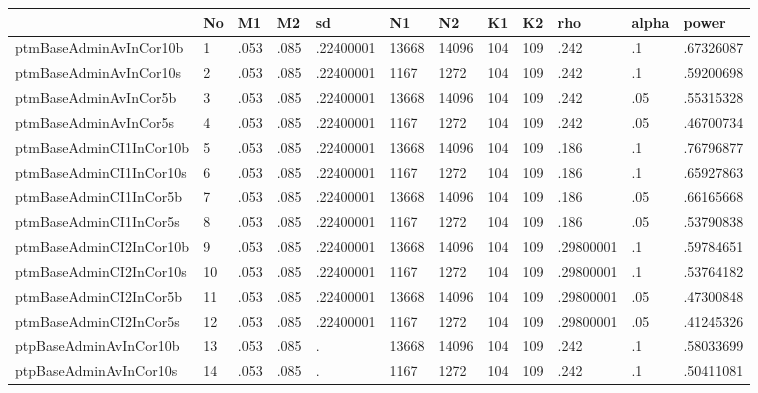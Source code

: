 \begin{tabular}{|l|l|l|l|l|l|l|l|l|l|l|l|}\hline  
 & No  & M1  & M2  & sd  & N1  & N2  & K1  & K2  & rho  & alpha  & power  \\ \hline  
ptmBaseAdminAvInCor10b & 1 & .053 & .085 & .22400001 & 13668 & 14096 & 104 & 109 & .242 & .1 & .67326087 \\ \hline 
ptmBaseAdminAvInCor10s & 2 & .053 & .085 & .22400001 & 1167 & 1272 & 104 & 109 & .242 & .1 & .59200698 \\ \hline 
ptmBaseAdminAvInCor5b & 3 & .053 & .085 & .22400001 & 13668 & 14096 & 104 & 109 & .242 & .05 & .55315328 \\ \hline 
ptmBaseAdminAvInCor5s & 4 & .053 & .085 & .22400001 & 1167 & 1272 & 104 & 109 & .242 & .05 & .46700734 \\ \hline 
ptmBaseAdminCI1InCor10b & 5 & .053 & .085 & .22400001 & 13668 & 14096 & 104 & 109 & .186 & .1 & .76796877 \\ \hline 
ptmBaseAdminCI1InCor10s & 6 & .053 & .085 & .22400001 & 1167 & 1272 & 104 & 109 & .186 & .1 & .65927863 \\ \hline 
ptmBaseAdminCI1InCor5b & 7 & .053 & .085 & .22400001 & 13668 & 14096 & 104 & 109 & .186 & .05 & .66165668 \\ \hline 
ptmBaseAdminCI1InCor5s & 8 & .053 & .085 & .22400001 & 1167 & 1272 & 104 & 109 & .186 & .05 & .53790838 \\ \hline 
ptmBaseAdminCI2InCor10b & 9 & .053 & .085 & .22400001 & 13668 & 14096 & 104 & 109 & .29800001 & .1 & .59784651 \\ \hline 
ptmBaseAdminCI2InCor10s & 10 & .053 & .085 & .22400001 & 1167 & 1272 & 104 & 109 & .29800001 & .1 & .53764182 \\ \hline 
ptmBaseAdminCI2InCor5b & 11 & .053 & .085 & .22400001 & 13668 & 14096 & 104 & 109 & .29800001 & .05 & .47300848 \\ \hline 
ptmBaseAdminCI2InCor5s & 12 & .053 & .085 & .22400001 & 1167 & 1272 & 104 & 109 & .29800001 & .05 & .41245326 \\ \hline 
ptpBaseAdminAvInCor10b & 13 & .053 & .085 & . & 13668 & 14096 & 104 & 109 & .242 & .1 & .58033699 \\ \hline 
ptpBaseAdminAvInCor10s & 14 & .053 & .085 & . & 1167 & 1272 & 104 & 109 & .242 & .1 & .50411081 \\ \hline 

\end{tabular}
